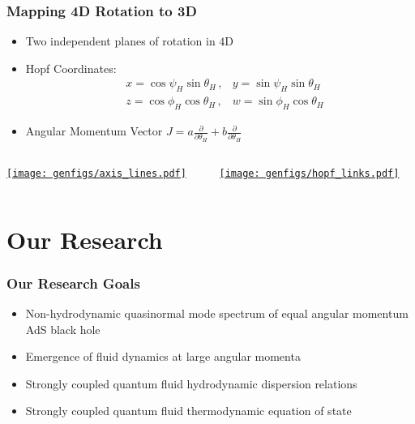 \documentclass[xcolor=dvipsnames]{beamer}
\begin{document}

\begin{frame}[squeeze]
  \frametitle{Mapping 4D Rotation to 3D}
  \begin{itemize}
    \item Two independent planes of rotation in $4$D 
    \item Hopf Coordinates: 
      \begin{align*}
        &x=\cos\psi_H\sin \theta_H\,,&y=\sin \psi_H\sin \theta_H\\
        &z=\cos \phi_H\cos \theta_H\,,&w=\sin \phi_H\cos \theta_H
      \end{align*}
    \item Angular Momentum Vector $J = a\frac\partial{\partial\theta_H} + b\frac\partial{\partial\theta_H}$
  \end{itemize}
  \begin{columns}[t]
    \begin{column}{0.5\paperwidth}
      \href{https://markuspad.com/figures/axis_lines.html}{\texttt{[image: genfigs/axis\_lines.pdf]}}
    \end{column}
    \begin{column}{0.5\paperwidth}
      \href{https://markuspad.com/figures/hopf_links.html}{\texttt{[image: genfigs/hopf\_links.pdf]}}
    \end{column}
  \end{columns}
\end{frame}

\section{Our Research}


\begin{frame}
  \frametitle{Our Research Goals}

  \begin{itemize}
    \item Non-hydrodynamic quasinormal mode spectrum of equal angular momentum AdS black hole
    \item Emergence of fluid dynamics at large angular momenta
    \item Strongly coupled quantum fluid hydrodynamic dispersion relations
    \item Strongly coupled quantum fluid thermodynamic equation of state
  \end{itemize}

\end{frame}
\end{document}
